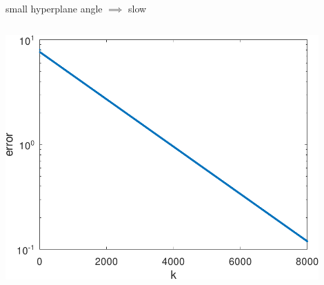 \documentclass[usepdftitle=false,usenames,dvipsnames]{beamer}
\begin{document}
\begin{frame}{small hyperplane angle $\implies$ slow}
\begin{columns}
\begin{column}{0.4\textwidth}
\bigskip
\hfill \includegraphics[width=0.9\textwidth]{figs/bad2err.pdf}
\end{column}
\end{columns}
\end{frame}
\end{document}
